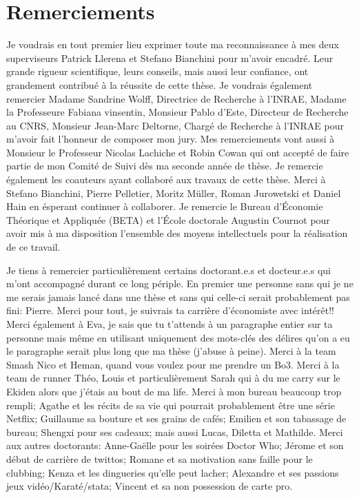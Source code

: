 \chapter*{Remerciements}

\thispagestyle{empty}
\justify
\quad 
Je voudrais en tout premier lieu exprimer toute ma reconnaissance à mes deux superviseurs Patrick Llerena et Stefano Bianchini pour m'avoir encadré. Leur grande rigueur scientifique, leurs conseils, mais aussi leur confiance, ont grandement contribué à la réussite de cette thèse. Je voudrais également remercier Madame Sandrine Wolff, Directrice de Recherche à l’INRAE, Madame la Professeure Fabiana vinsentin, Monsieur Pablo d'Este, Directeur de Recherche au CNRS, Monsieur Jean-Marc Deltorne, Chargé de Recherche à l’INRAE pour m’avoir fait l’honneur de composer mon jury. Mes remerciements vont aussi à Monsieur le Professeur Nicolas Lachiche et Robin Cowan qui ont accepté de faire partie de mon Comité de Suivi dès ma seconde année de thèse. Je remercie également les coauteurs ayant collaboré aux travaux de cette thèse. Merci à Stefano Bianchini, Pierre Pelletier, Moritz Müller, Roman Jurowetski et Daniel Hain en ésperant continuer à collaborer. Je remercie le Bureau d’Économie Théorique et Appliquée (BETA) et l’École doctorale Augustin Cournot pour avoir mis à ma disposition l’ensemble des moyens intellectuels pour la réalisation de ce travail.

Je tiens à remercier particulièrement certains doctorant.e.s et docteur.e.s qui m’ont accompagné durant ce long périple. En premier une personne sans qui je ne me serais jamais lancé dans une thèse et sans qui celle-ci serait probablement pas fini: Pierre. Merci pour tout, je suivrais ta carrière d'économiste avec intérêt!! Merci également à Eva, je sais que tu t'attends à un paragraphe entier sur ta personne mais même en utilisant uniquement des mots-clés des délires qu'on a eu le paragraphe serait plus long que ma thèse (j'abuse à peine). Merci à la team Smash Nico et Heman, quand vous voulez pour me prendre un Bo3. Merci à la team de runner Théo, Louis et particulièrement Sarah qui à du me carry sur le Ekiden alors que j'étais au bout de ma life. Merci à mon bureau beaucoup trop rempli; Agathe et les récits de sa vie qui pourrait probablement être une série Netflix; Guillaume sa bouture et ses grains de cafés; Emilien et son tabassage de bureau; Shengxi pour ses cadeaux; mais aussi Lucas, Diletta et Mathilde. Merci aux autres doctorants: Anne-Gaëlle pour les soirées Doctor Who; Jérome et son début de carrière de twittos; Romane et sa motivation sans faille pour le clubbing; Kenza et les dingueries qu'elle peut lacher; Alexandre et ses passions jeux vidéo/Karaté/stata; Vincent et sa non possession de carte pro.  

